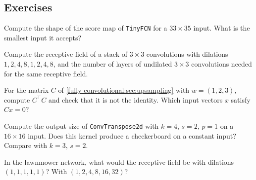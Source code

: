 \begin{notechapter}
\section*{Exercises}

\begin{exercise}\label{fully-convolutional:exr:1}
Compute the shape of the score map of \texttt{TinyFCN} for a $33\times35$ input. What is the smallest input
it accepts?
\end{exercise}

\begin{exercise}\label{fully-convolutional:exr:2}
Compute the receptive field of a stack of $3\times3$ convolutions with dilations $1, 2, 4, 8, 1, 2, 4, 8$, and the
number of layers of undilated $3\times3$ convolutions needed for the same receptive field.
\end{exercise}

\begin{exercise}\label{fully-convolutional:exr:3}
For the matrix $C$ of \cref{fully-convolutional:sec:upsampling} with $w = (1,2,3)$, compute $C^\top C$ and check that it is not
the identity. Which input vectors $x$ satisfy $Cx = 0$?
\end{exercise}

\begin{exercise}\label{fully-convolutional:exr:4}
Compute the output size of \texttt{ConvTranspose2d} with $k = 4$, $s = 2$, $p = 1$ on a $16\times16$ input. Does this
kernel produce a checkerboard on a constant input? Compare with $k = 3$, $s = 2$.
\end{exercise}

\begin{exercise}\label{fully-convolutional:exr:5}
In the lawnmower network, what would the receptive field be with dilations $(1,1,1,1,1)$? With
$(1,2,4,8,16,32)$?
\end{exercise}
\end{notechapter}
